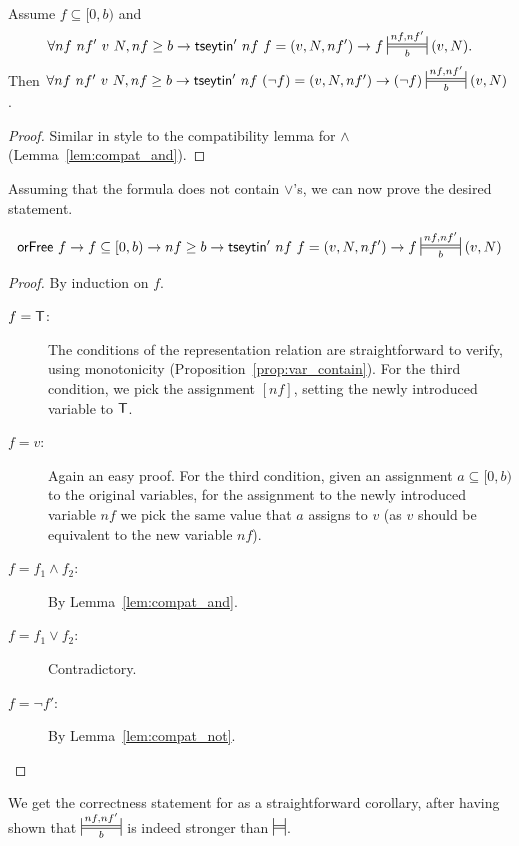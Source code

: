 \begin{lemma}\label{lem:compat_not}~\\
  Assume $f \subseteq [0, b)$ and 
  \[\forall nf~nf'~v~N, nf \ge b \rightarrow \tseytin'~nf~f = (v, N, nf') \rightarrow f \Frepr{nf}{nf'}{b} (v, N).\]
  Then 
  $\forall nf~nf'~v~N, nf \ge b \rightarrow \tseytin'~nf~(\lnot f) = (v, N, nf') \rightarrow (\lnot f) \Frepr{nf}{nf'}{b} (v, N)$. 
\end{lemma}
\begin{proof}
  Similar in style to the compatibility lemma for $\land$ (Lemma~\ref{lem:compat_and}).
\end{proof}

Assuming that the formula does not contain $\lor$'s, we can now prove the desired statement. 
\begin{theorem}
  \[\orFree~f \rightarrow f \subseteq [0, b) \rightarrow nf \ge b \rightarrow \tseytin'~nf~f = (v, N, nf') \rightarrow f \Frepr{nf}{nf'}{b} (v, N)\] 
\end{theorem}
\begin{proof}
  By induction on $f$.
  \begin{description}
    \item[$f = \mathsf{T}$:] The conditions of the representation relation are straightforward to verify, using monotonicity (Proposition~\ref{prop:var_contain}). For the third condition, we pick the assignment $[nf]$, setting the newly introduced variable to $\mathsf{T}$.
    \item[$f = v$:] Again an easy proof. For the third condition, given an assignment $a \subseteq [0, b)$ to the original variables, for the assignment to the newly introduced variable $nf$ we pick the same value that $a$ assigns to $v$ (as $v$ should be equivalent to the new variable $nf$). 
    \item[$f = f_1 \land f_2$:] By Lemma~\ref{lem:compat_and}.
    \item[$f = f_1 \lor f_2$:] Contradictory.
    \item[$f = \lnot f'$:] By Lemma~\ref{lem:compat_not}.
  \end{description}
\end{proof}

We get the correctness statement for \tseytin{} as a straightforward corollary, after having shown that $\Frepr{nf}{nf'}{b}$ is indeed stronger than $\frepr$.

